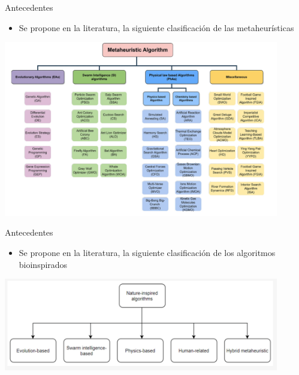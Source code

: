 \documentclass{beamer}
\begin{document}
\begin{frame}{Antecedentes}
    \begin{itemize}
        \item Se propone en la literatura, la siguiente clasificación de las metaheurísticas
    \end{itemize}
    \vspace{0.5cm}
    \centering
    \includegraphics[width=0.9\textwidth]{mataheuristic-class.png}
\end{frame}

\begin{frame}{Antecedentes}
    \begin{itemize}
        \item Se propone en la literatura, la siguiente clasificación de los algoritmos bioinspirados  
    \end{itemize}
    \vspace{0.5cm}
    \centering
    \includegraphics[width=0.9\textwidth]{classification_2.png}
\end{frame}
\end{document}
